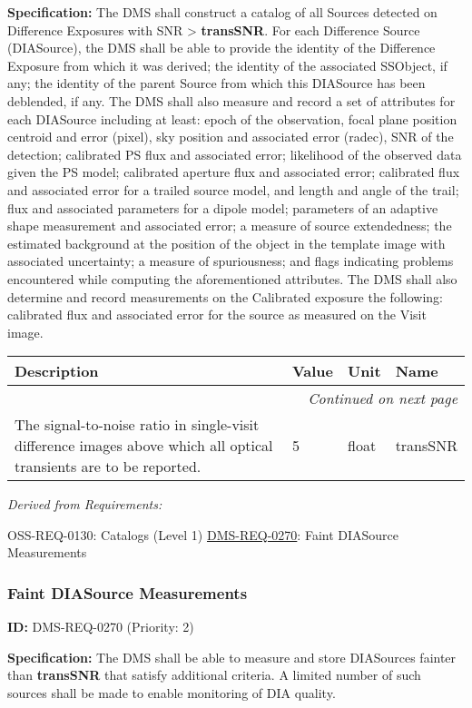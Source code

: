 \documentclass[SE,toc,lsstdraft]{lsstdoc}
\makeatletter
\newcommand{\paramname}[1]{\hspace{0pt}#1}
\newcommand{\unitname}[1]{\hspace{0pt}#1}
\newenvironment{parameters}[0]{%
\setlength\LTleft{0pt}
\setlength\LTright{\fill}
\begin{small}
\begin{longtable}[]{|p{0.49\textwidth}|l|p{0.6in}|p{1.70in}@{}|}

\hline \textbf{Description} & \textbf{Value} & \textbf{Unit} & \textbf{Name} \\ \hline
\endhead

\hline \multicolumn{4}{r}{\emph{Continued on next page}} \\
\endfoot

\hline\hline
\endlastfoot
}{%
\hline
\end{longtable}
\end{small}
}
\makeatother
\begin{document}
\textbf{Specification:} The DMS shall construct a catalog of all Sources detected on Difference Exposures with SNR > \textbf{transSNR}. For each Difference Source (DIASource), the DMS shall be able to provide the identity of the Difference Exposure from which it was derived; the identity of the associated SSObject, if any; the identity of the parent Source from which this DIASource has been deblended, if any. The DMS shall also measure and record a set of attributes for each DIASource including at least: epoch of the observation, focal plane position centroid and error (pixel), sky position and associated error (radec), SNR of the detection; calibrated PS flux and associated error; likelihood of the observed data given the PS model; calibrated aperture flux and associated error; calibrated flux and associated error for a trailed source model, and length and angle of the trail; flux and associated parameters for a dipole model; parameters of an adaptive shape measurement and associated error; a measure of source extendedness; the estimated background at the position of the object in the template image with associated uncertainty; a measure of spuriousness; and flags indicating problems encountered while computing the aforementioned attributes. The DMS shall also determine and record measurements on the Calibrated exposure the following: calibrated flux and associated error for the source as measured on the Visit image.

\begin{parameters}
The signal-to-noise ratio in single-visit difference images above which all optical transients are to be reported.
&
5
&
\unitname{%
float
}
&
\paramname{%
transSNR
} \\\hline
\end{parameters}

\emph{Derived from Requirements:}

OSS-REQ-0130:
Catalogs (Level 1) \newline
\hyperref[DMS-REQ-0270]{DMS-REQ-0270}:
Faint DIASource Measurements \newline

\subsubsection{Faint DIASource Measurements}

\label{DMS-REQ-0270}
\textbf{ID:} DMS-REQ-0270 (Priority: 2)

\textbf{Specification:} The DMS shall be able to measure and store DIASources fainter than \textbf{transSNR }that satisfy additional criteria. A limited number of such sources shall be made to enable monitoring of DIA quality.
\end{document}
